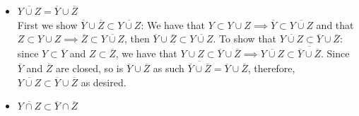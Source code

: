\documentclass{article} %
\begin{document}
\begin{itemize}
  \item $\overline{Y \cup Z} = \overline{Y} \cup \overline{Z}$\\
    First we show $\overline{Y}  \cup \overline{Z} \subset
    \overline{Y \cup Z}$: We have that $Y \subset Y \cup Z \implies
    \overline Y \subset \overline{Y \cup Z}$ and that
    $Z \subset Y \cup Z \implies \overline{Z} \subset \overline{Y
    \cup Z}$, then $\overline Y \cup \overline Z \subset \overline{Y
    \cup Z}$. To show that $\overline{Y \cup Z} \subset
    \overline Y \cup  \overline Z$: since $Y \subset \overline Y$ and
    $Z \subset \overline Z$, we have that $Y \cup Z \subset \overline
    Y \cup  \overline Z \implies \overline{Y \cup Z} \subset
    \overline{\overline{Y} \cup \overline{Z}}$. Since $\overline Y$
    and $\overline Z$ are
    closed, so is $\overline Y \cup \overline Z$ as such
    $\overline{\overline Y \cup \overline Z} = \overline Y \cup
    \overline Z$, therefore, $\overline{Y \cup Z} \subset \overline Y
    \cup \overline Z$ as desired.

  \item $\overline{Y \cap Z}  \subset \overline Y \cap \overline Z$


\end{itemize}
\end{document}
